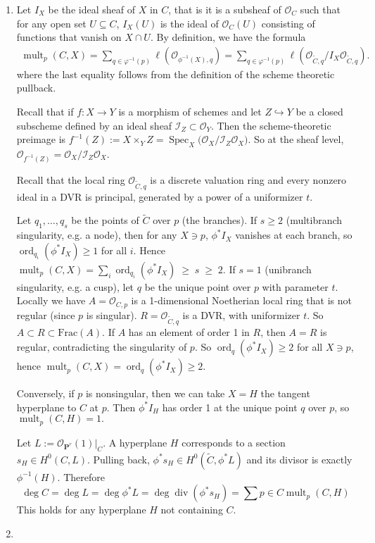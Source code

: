 \documentclass[12pt]{article}
\begin{document}
\begin{enumerate}
    \item Let $I_X$ be the ideal sheaf of $X$ in $C$, that is it is a subsheaf of $\mathcal{O}_C$ such that for any open set $U \subseteq C$, $I_X(U)$ is the ideal of $\mathcal{O}_C(U)$ consisting of functions that vanish on $X \cap U$. By definition, we have the formula \begin{align*}
    \operatorname{mult}_p(C,X) = 
    \sum_{q \in \varphi^{-1}(p)} \ell(\mathcal{O}_{\phi^{-1}(X),q})
    = \sum_{q \in \varphi^{-1}(p)} \ell(\mathcal{O}_{\widetilde{C},q}/I_X\mathcal{O}_{\widetilde{C},q}).
\end{align*} where the last equality follows from the definition of the scheme theoretic pullback. 

Recall that if $f : X \to Y$ is a morphism of schemes and let $Z \hookrightarrow Y$ be a closed subscheme defined by an ideal sheaf $\mathcal I_Z \subset \mathcal O_Y$. Then the scheme-theoretic preimage is $f^{-1}(Z) := X \times_Y Z = \operatorname{Spec}_X\!\big( \mathcal O_X / \mathcal I_Z \mathcal O_X \big)$. So at the sheaf level, $\mathcal O_{f^{-1}(Z)} = \mathcal O_X / \mathcal I_Z \mathcal O_X$.

Recall that the local ring $\mathcal{O}_{\tilde{C},q}$ is a discrete valuation ring and every nonzero ideal in a DVR is principal, generated by a power of a uniformizer $t$.

Let $q_1,\dots,q_s$ be the points of $\widetilde{C}$ over $p$ (the branches). If $s\ge 2$ (multibranch singularity, e.g. a node), then for any $X\ni p$, $\phi^*I_X$ vanishes at each branch, so $\operatorname{ord}_{q_i}(\phi^*I_X)\ge 1$ for all $i$. Hence
$\operatorname{mult}_p(C,X)=\sum_i \operatorname{ord}_{q_i}(\phi^*I_X)\;\ge\; s\;\ge\;2.$ If $s=1$ (unibranch singularity, e.g. a cusp), let $q$ be the unique point over $p$ with parameter $t$. Locally we have $A = \mathcal O_{C,p} $ is a 1-dimensional Noetherian local ring that is not regular (since $p$ is singular). $R = \mathcal O_{\widetilde C, q}$ is a DVR, with uniformizer $t$. So $A\subset R\subset \mathrm{Frac}(A)$. If $A$ has an element of order 1 in $R$, then $A=R$ is regular, contradicting the singularity of $p$. So $\operatorname{ord}_q(\phi^*I_X)\ge 2$ for all $X\ni p$, hence $\operatorname{mult}_p(C,X)=\operatorname{ord}_q(\phi^*I_X)\ge 2.$

Conversely, if $p$ is nonsingular, then we can take $X = H$ the tangent hyperplane to $C$ at $p$. Then $\phi^*I_H$ has order 1 at the unique point $q$ over $p$, so $\operatorname{mult}_p(C,H)=1.$

Let $L:=\mathcal O_{\mathbf P^r}(1)\vert_C$. A hyperplane $H$ corresponds to a section $s_H\in H^0(C,L)$. Pulling back, $\phi^*s_H\in H^0(\widetilde C,\phi^*L)$ and its divisor is exactly $\phi^{-1}(H)$. Therefore $$\deg C=\deg L=\deg \phi^*L =\deg \operatorname{div}(\phi^*s_H)
=\sum{p\in C}\operatorname{mult}_p(C,H)$$This holds for any hyperplane $H$ not containing $C$.
\item 
\end{enumerate}
\end{document}

